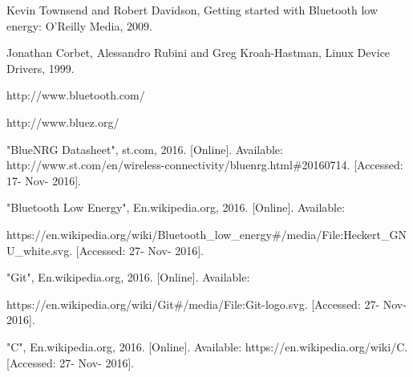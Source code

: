  
\begin{thebibliography}{22}

\bibitem{} Kevin Townsend and Robert Davidson, Getting started with Bluetooth low energy: O'Reilly Media, 2009.

\bibitem{} Jonathan Corbet, Alessandro Rubini and Greg Kroah-Hastman, Linux Device Drivers, 1999.

\bibitem{} http://www.bluetooth.com/

\bibitem{} http://www.bluez.org/

\bibitem{} "BlueNRG Datasheet", st.com, 2016. [Online]. Available: http://www.st.com/en/wireless-connectivity/bluenrg.html\#20160714. [Accessed: 17- Nov- 2016].

\bibitem{} "Bluetooth Low Energy", En.wikipedia.org, 2016. [Online]. Available: 

https://en.wikipedia.org/wiki/Bluetooth\_low\_energy\#/media/File:Heckert\_GNU\_white.svg. [Accessed: 27- Nov- 2016].

\bibitem{} "Git", En.wikipedia.org, 2016. [Online]. Available: 

https://en.wikipedia.org/wiki/Git\#/media/File:Git-logo.svg. [Accessed: 27- Nov- 2016].

\bibitem{} "C", En.wikipedia.org, 2016. [Online]. Available: https://en.wikipedia.org/wiki/C. [Accessed: 27- Nov- 2016].

\end{thebibliography}
